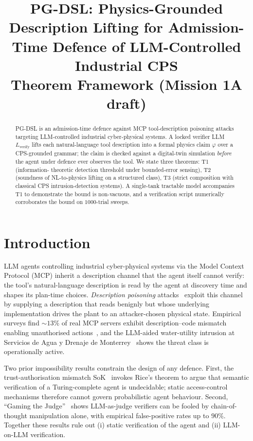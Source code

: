 \documentclass[11pt]{article}
\title{PG-DSL: Physics-Grounded Description Lifting for Admission-Time
       Defence of LLM-Controlled Industrial CPS \\
       \large{Theorem Framework (Mission 1A draft)}}
\author{}
\date{}
\begin{document}
\maketitle

\begin{abstract}
PG-DSL is an admission-time defence against MCP tool-description poisoning
attacks targeting LLM-controlled industrial cyber-physical systems. A locked
verifier LLM $L_{\text{verify}}$ lifts each natural-language tool description
into a formal physics claim $\varphi$ over a CPS-grounded grammar; the claim is
checked against a digital-twin simulation \emph{before} the agent under
defence ever observes the tool. We state three theorems: T1 (information-
theoretic detection threshold under bounded-error sensing), T2 (soundness of
NL-to-physics lifting on a structured class), T3 (strict composition with
classical CPS intrusion-detection systems). A single-tank tractable model
accompanies T1 to demonstrate the bound is non-vacuous, and a verification
script numerically corroborates the bound on $1000$-trial sweeps.
\end{abstract}

\section{Introduction}

LLM agents controlling industrial cyber-physical systems via the Model Context
Protocol (MCP) inherit a description channel that the agent itself cannot
verify: the tool's natural-language description is read by the agent at
discovery time and shapes its plan-time choices. \emph{Description poisoning}
attacks~\cite{mcpshield2026,dontbelieve2026} exploit this channel by supplying
a description that reads benignly but whose underlying implementation drives
the plant to an attacker-chosen physical state. Empirical surveys find $\sim
13\%$ of real MCP servers exhibit description--code mismatch enabling
unauthorised actions~\cite{dontbelieve2026}, and the LLM-aided water-utility
intrusion at Servicios de Agua y Drenaje de Monterrey~\cite{dragosmonterrey2026}
shows the threat class is operationally active.

Two prior impossibility results constrain the design of any defence. First,
the trust-authorisation mismatch SoK~\cite{trustauthsok2025} invokes Rice's
theorem to argue that semantic verification of a Turing-complete agent is
undecidable; static access-control mechanisms therefore cannot govern
probabilistic agent behaviour. Second, ``Gaming the Judge''~\cite{gamingjudge2026}
shows LLM-as-judge verifiers can be fooled by chain-of-thought manipulation
alone, with empirical false-positive rates up to $90\%$. Together these results
rule out (i) static verification of the agent and (ii) LLM-on-LLM
verification.
\end{document}
